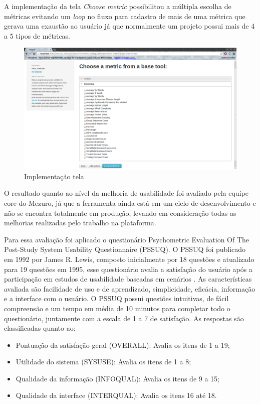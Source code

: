 A implementação da tela \textit{Choose metric} possibilitou a múltipla escolha de métricas evitando um \textit{loop} no fluxo para cadastro de mais de uma métrica que gerava uma exaustão ao usuário já que normalmente um projeto possui mais de 4 a 5 tipos de métricas.

\graphicspath{{figuras/}}
\begin{figure}[h]
\centering
\includegraphics[width=1.0\textwidth]{select_metrics}
\caption{Implementação tela}
\label{parallel-coordinate}
\end{figure}

O resultado quanto ao nível da melhoria de usabilidade foi avaliado pela equipe core do Mezuro, já que a ferramenta ainda está em um ciclo de desenvolvimento e não se encontra totalmente em produção, levando em consideração todas as melhorias realizadas pelo trabalho na plataforma.

Para essa avaliação foi aplicado o questionário Psychometric Evaluation Of The Post-Study System Usability Questionnaire (PSSUQ). O PSSUQ foi publicado em 1992 por James R. Lewis, composto inicialmente por 18 questões e atualizado para 19 questões em 1995, esse questionário avalia a satisfação do usuário após a participação em estudos de usabilidade baseadas em cenários \cite{lewis1992}. As características avaliada são facilidade de uso e de aprendizado, simplicidade, eficácia, informação e a interface com o usuário. O PSSUQ possui questões intuitivas, de fácil compreensão e um tempo em média de 10 minutos para completar todo o questionário, juntamente com a escala de 1 a 7 de satisfação. As respostas são classificadas quanto ao:
\begin{itemize}
\item Pontuação da satisfação geral (OVERALL): Avalia os itens de 1 a 19;
\item Utilidade do sistema (SYSUSE): Avalia os itens de 1 a 8;
\item Qualidade da informação (INFOQUAL): Avalia os itens de 9 a 15;
\item Qualidade da interface (INTERQUAL): Avalia os itens 16 até 18.
\end{itemize}

